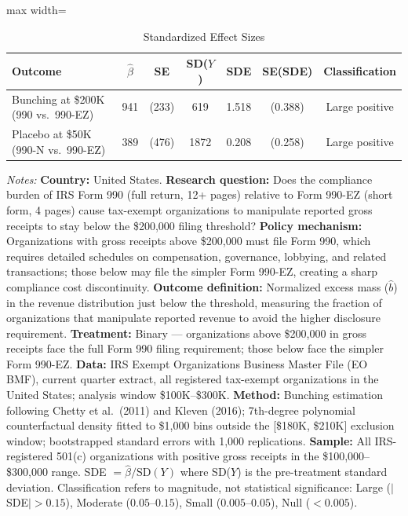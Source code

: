 \begin{table}[htbp]
\centering
\caption{Standardized Effect Sizes}
\label{tab:sde}
\begin{adjustbox}{max width=\textwidth}
\begin{tabular}{lcccccc}
\hline\hline
Outcome & $\hat{\beta}$ & SE & SD($Y$) & SDE & SE(SDE) & Classification \\
\hline
Bunching at \$200K (990 vs.\ 990-EZ) & 941 & (233) & 619 & 1.518 & (0.388) & Large positive \\
Placebo at \$50K (990-N vs.\ 990-EZ) & 389 & (476) & 1872 & 0.208 & (0.258) & Large positive \\
\hline\hline
\end{tabular}
\end{adjustbox}
\begin{tablenotes}
\item \textit{Notes:} \textbf{Country:} United States. \textbf{Research question:} Does the compliance burden of IRS Form 990 (full return, 12+ pages) relative to Form 990-EZ (short form, 4 pages) cause tax-exempt organizations to manipulate reported gross receipts to stay below the \$200,000 filing threshold? \textbf{Policy mechanism:} Organizations with gross receipts above \$200,000 must file Form 990, which requires detailed schedules on compensation, governance, lobbying, and related transactions; those below may file the simpler Form 990-EZ, creating a sharp compliance cost discontinuity. \textbf{Outcome definition:} Normalized excess mass ($\hat{b}$) in the revenue distribution just below the threshold, measuring the fraction of organizations that manipulate reported revenue to avoid the higher disclosure requirement. \textbf{Treatment:} Binary --- organizations above \$200,000 in gross receipts face the full Form 990 filing requirement; those below face the simpler Form 990-EZ. \textbf{Data:} IRS Exempt Organizations Business Master File (EO BMF), current quarter extract, all registered tax-exempt organizations in the United States; analysis window \$100K--\$300K. \textbf{Method:} Bunching estimation following Chetty et al.\ (2011) and Kleven (2016); 7th-degree polynomial counterfactual density fitted to \$1,000 bins outside the [\$180K, \$210K] exclusion window; bootstrapped standard errors with 1,000 replications. \textbf{Sample:} All IRS-registered 501(c) organizations with positive gross receipts in the \$100,000--\$300,000 range. SDE $= \hat{\beta} / \text{SD}(Y)$ where SD($Y$) is the pre-treatment standard deviation. Classification refers to magnitude, not statistical significance: Large ($|$SDE$| > 0.15$), Moderate ($0.05$--$0.15$), Small ($0.005$--$0.05$), Null ($< 0.005$). 
\end{tablenotes}
\end{table}
